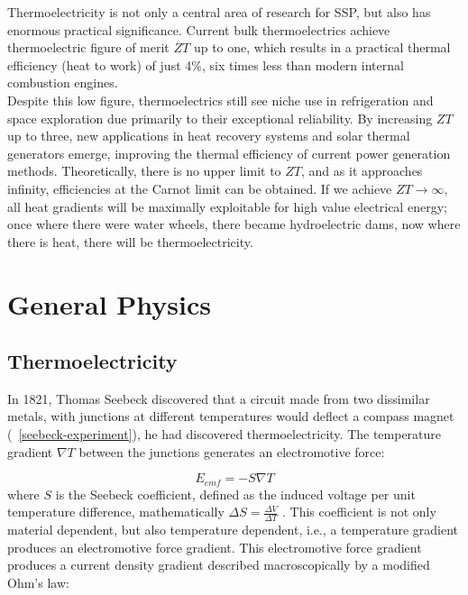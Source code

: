 \documentclass[a4paper,10pt,journal]{IEEEtran}
\newcommand{\figref}[2][\figurename~]{#1\ref{#2}}
\begin{document}
Thermoelectricity is not only a central area of research for
\ac{SSP}, but also has enormous practical significance. Current
bulk thermoelectrics achieve thermoelectric figure of merit $ZT$ up to
one, which results in a practical thermal efficiency (heat to work) of
just 4\%, six times less than modern internal combustion engines.\\
Despite this low figure, thermoelectrics still see niche use
in refrigeration and space exploration due primarily to their
exceptional reliability. By increasing $ZT$ up to three, new
applications in heat recovery systems and solar thermal generators
emerge, improving the thermal efficiency of current power generation
methods. Theoretically, there is no upper limit to $ZT$, and as it
approaches infinity, efficiencies at the Carnot limit can be obtained.
If we achieve $ZT \to\infty$, all heat gradients will be maximally
exploitable for high value electrical energy; once where there were
water wheels, there became hydroelectric dams, now where there is
heat, there will be thermoelectricity.

\section{General Physics}
\subsection{Thermoelectricity}
In 1821, Thomas Seebeck discovered that a circuit made from two
dissimilar metals, with junctions at different temperatures would
deflect a compass magnet (\figref{seebeck-experiment}), he had
discovered thermoelectricity. The temperature gradient $\nabla
T$ between the junctions generates an electromotive force:

\begin{equation}
\label{seebeck-emf}
	E_{emf} = -S \nabla T
\end{equation}
where $S$ is the Seebeck coefficient, defined as the induced voltage per
unit temperature difference, mathematically $\Delta S = \frac{\Delta
V}{\Delta T}$ \cite{auparay}. This coefficient is not only material
dependent, but also temperature dependent, i.e., a temperature gradient
produces an electromotive force gradient. This electromotive force
gradient produces a current density gradient described macroscopically
by a modified Ohm's law:
\end{document}
